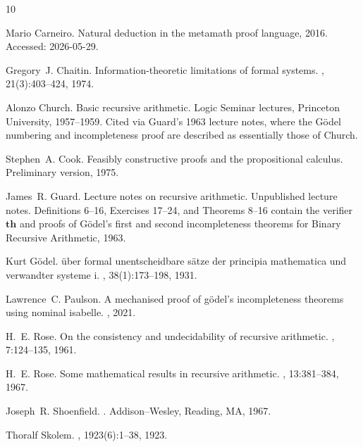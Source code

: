 \documentclass[11pt]{article}
\theoremstyle{plain}
\theoremstyle{definition}
\theoremstyle{remark}
\begin{document}
\begin{thebibliography}{10}

Mario Carneiro.
\newblock Natural deduction in the metamath proof language, 2016.
\newblock Accessed: 2026-05-29.

Gregory~J. Chaitin.
\newblock Information-theoretic limitations of formal systems.
, 21(3):403--424, 1974.

Alonzo Church.
\newblock Basic recursive arithmetic.
\newblock Logic Seminar lectures, Princeton University, 1957--1959. Cited via
  Guard's 1963 lecture notes, where the G\"odel numbering and incompleteness
  proof are described as essentially those of Church.

Stephen~A. Cook.
\newblock Feasibly constructive proofs and the propositional calculus.
\newblock Preliminary version, 1975.

James~R. Guard.
\newblock Lecture notes on recursive arithmetic.
\newblock Unpublished lecture notes. Definitions 6--16, Exercises 17--24, and
  Theorems 8--16 contain the verifier $\mathbf{th}$ and proofs of G\"odel's
  first and second incompleteness theorems for Binary Recursive Arithmetic,
  1963.

Kurt Gödel.
\newblock \"uber formal unentscheidbare s{\"a}tze der principia mathematica und
  verwandter systeme i.
, 38(1):173--198,
  1931.

Lawrence~C. Paulson.
\newblock A mechanised proof of g{\"o}del's incompleteness theorems using
  nominal isabelle.
, 2021.

H.~E. Rose.
\newblock On the consistency and undecidability of recursive arithmetic.
, 7:124--135, 1961.

H.~E. Rose.
\newblock Some mathematical results in recursive arithmetic.
, 13:381--384, 1967.

Joseph~R. Shoenfield.
.
\newblock Addison--Wesley, Reading, MA, 1967.

Thoralf Skolem.
, 1923(6):1--38, 1923.


\end{thebibliography}
\end{document}
